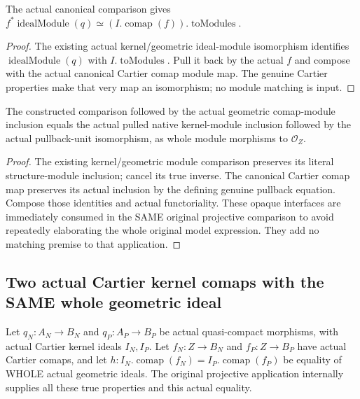 \begin{definition}
\label{def:seven-cartier-kernel-comap-module-iso-route}

The actual canonical comparison gives
$f^*\operatorname{idealModule}(q)\simeq(I.\operatorname{comap}(f)).
\operatorname{toModules}$.
\end{definition}
\begin{proof}
The existing actual kernel/geometric ideal-module isomorphism identifies
$\operatorname{idealModule}(q)$ with $I.\operatorname{toModules}$.
Pull it back by the actual $f$ and compose with the actual canonical
Cartier comap module map. The genuine Cartier properties make that very
map an isomorphism; no module matching is input.
\end{proof}

\begin{theorem}
\label{thm:seven-cartier-kernel-comap-module-inclusion-route}
\leanok
{}
The constructed comparison followed by the actual geometric comap-module
inclusion equals the actual pulled native kernel-module inclusion followed
by the actual pullback-unit isomorphism, as whole module morphisms to
$\mathcal O_Z$.
\end{theorem}
\begin{proof}
The existing kernel/geometric module comparison preserves its literal
structure-module inclusion; cancel its true inverse. The canonical
Cartier comap map preserves its actual inclusion by the defining genuine
pullback equation. Compose those identities and actual functoriality.
These opaque interfaces are immediately consumed in the SAME original
projective comparison to avoid repeatedly elaborating the whole original
model expression. They add no matching premise to that application.
\end{proof}

\subsection{Two actual Cartier kernel comaps with the SAME whole geometric ideal}
Let $q_N:A_N\to B_N$ and $q_P:A_P\to B_P$ be actual quasi-compact
morphisms, with actual Cartier kernel ideals $I_N,I_P$. Let
$f_N:Z\to B_N$ and $f_P:Z\to B_P$ have actual Cartier comaps, and let
$h:I_N.\operatorname{comap}(f_N)=I_P.\operatorname{comap}(f_P)$ be equality
of WHOLE actual geometric ideals. The original projective application
internally supplies all these true properties and this actual equality.

